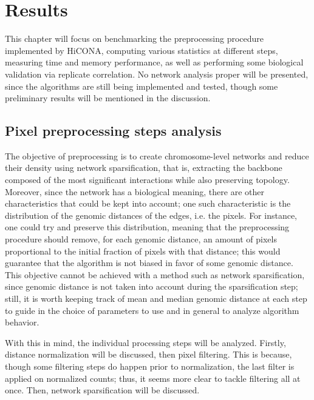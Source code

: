 \graphicspath{{chapters/05_results/images}}
\chapter{Results}


This chapter will focus on benchmarking the preprocessing procedure implemented by HiCONA, computing various statistics at different steps, measuring time and memory performance, as well as performing some biological validation via replicate correlation. No network analysis proper will be presented, since the algorithms are still being implemented and tested, though some preliminary results will be mentioned in the discussion.

\section{Pixel preprocessing steps analysis}

The objective of preprocessing is to create chromosome-level networks and reduce their density using network sparsification, that is, extracting the backbone composed of the most significant interactions while also preserving topology. Moreover, since the network has a biological meaning, there are other characteristics that could be kept into account; one such characteristic is the distribution of the genomic distances of the edges, i.e. the pixels. For instance, one could try and preserve this distribution, meaning that the preprocessing procedure should remove, for each genomic distance, an amount of pixels proportional to the initial fraction of pixels with that distance; this would guarantee that the algorithm is not biased in favor of some genomic distance. This objective cannot be achieved with a method such as network sparsification, since genomic distance is not taken into account during the sparsification step; still, it is worth keeping track of mean and median genomic distance at each step to guide in the choice of parameters to use and in general to analyze algorithm behavior. 

With this in mind, the individual processing steps will be analyzed. Firstly, distance normalization will be discussed, then pixel filtering. This is because, though some filtering steps do happen prior to normalization, the last filter is applied on normalized counts; thus, it seems more clear to tackle filtering all at once. Then, network sparsification will be discussed. 

